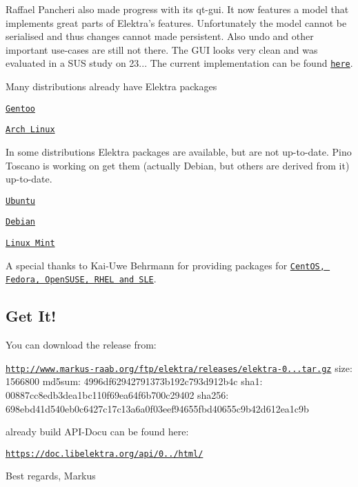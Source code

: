 Raffael Pancheri also made progress with its qt-\/gui. It now features a model that implements great parts of Elektra’s features. Unfortunately the model cannot be serialised and thus changes cannot made persistent. Also undo and other important use-\/cases are still not there. The G\+UI looks very clean and was evaluated in a S\+US study on 23... The current implementation can be found \href{https://github.com/0003088/qt-gui}{\tt here}.

Many distributions already have Elektra packages


\begin{DoxyItemize}
\item \href{http://packages.gentoo.org/package/app-admin/elektra}{\tt Gentoo}
\item \href{https://aur.archlinux.org/packages/elektra/}{\tt Arch Linux}
\end{DoxyItemize}

In some distributions Elektra packages are available, but are not up-\/to-\/date. Pino Toscano is working on get them (actually Debian, but others are derived from it) up-\/to-\/date.


\begin{DoxyItemize}
\item \href{https://launchpad.net/ubuntu/+source/elektra}{\tt Ubuntu}
\item \href{https://packages.debian.org/de/wheezy/libelektra3}{\tt Debian}
\item \href{http://community.linuxmint.com/software/view/elektra}{\tt Linux Mint}
\end{DoxyItemize}

A special thanks to Kai-\/\+Uwe Behrmann for providing packages for \href{http://software.opensuse.org/download.html?project=home%3Abekun&package=elektra}{\tt Cent\+OS, Fedora, Open\+S\+U\+SE, R\+H\+EL and S\+LE}.

\subsection*{Get It!}

You can download the release from\+:

\href{http://www.markus-raab.org/ftp/elektra/releases/elektra-0.8.7.tar.gz}{\tt http\+://www.\+markus-\/raab.\+org/ftp/elektra/releases/elektra-\/0...\+tar.\+gz} size\+: 1566800 md5sum\+: 4996df62942791373b192c793d912b4c sha1\+: 00887cc8edb3dea1bc110f69ea64f6b700c29402 sha256\+: 698ebd41d540eb0c6427c17c13a6a0f03eef94655fbd40655c9b42d612ea1c9b

already build A\+P\+I-\/\+Docu can be found here\+:

\href{https://doc.libelektra.org/api/0.8.7/html/}{\tt https\+://doc.\+libelektra.\+org/api/0../html/}

Best regards, Markus 